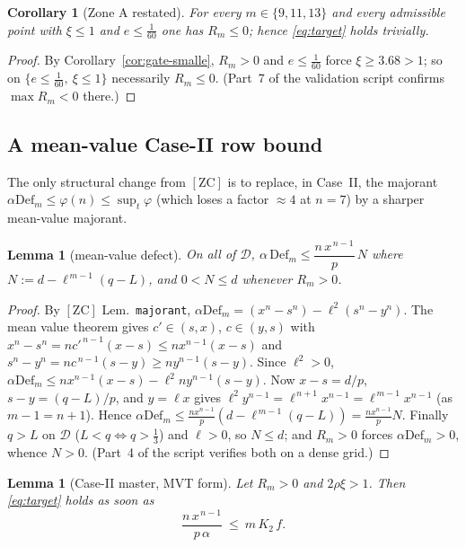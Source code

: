 \documentclass[11pt]{amsart}
\newtheorem{lemma}[theorem]{Lemma}
\newtheorem{corollary}[theorem]{Corollary}
\newcommand{\D}{\mathcal D}
\newcommand{\Def}{\mathrm{Def}}
\newcommand{\ZC}{[\textrm{ZC}]}
\begin{document}
\begin{corollary}[Zone A restated]\label{zc9:cor:za}
For every $m\in\{9,11,13\}$ and every admissible point with $\xi\le1$ and
$e\le\tfrac1{60}$ one has $R_m\le0$; hence \eqref{eq:target} holds trivially.
\end{corollary}

\begin{proof}
By Corollary~\ref{cor:gate-smalle}, $R_m>0$ and $e\le\tfrac1{60}$ force
$\xi\ge3.68>1$; so on $\{e\le\tfrac1{60},\ \xi\le1\}$ necessarily $R_m\le0$.
(Part~7 of the validation script confirms $\max R_m<0$ there.)
\end{proof}

\subsection*{A mean-value Case-II row bound}
The only structural change from $\ZC$ is to replace, in Case~II, the majorant
$\alpha\Def_m\le\varphi(n)\le\sup_t\varphi$ (which loses a factor $\approx4$ at
$n=7$) by a sharper mean-value majorant.

\begin{lemma}[mean-value defect]\label{zc9:lem:mvt}
On all of $\D$, $\alpha\,\Def_m\le\dfrac{n\,x^{\,n-1}}p\,N$ where
$N:=d-\ell^{\,m-1}(q-L)$, and $0<N\le d$ whenever $R_m>0$.
\end{lemma}

\begin{proof}
By $\ZC$ Lem.~\texttt{majorant}, $\alpha\Def_m=(x^n-s^n)-\ell^2(s^n-y^n)$.  The
mean value theorem gives $c'\in(s,x)$, $c\in(y,s)$ with
$x^n-s^n=nc'^{\,n-1}(x-s)\le nx^{n-1}(x-s)$ and
$s^n-y^n=nc^{\,n-1}(s-y)\ge ny^{n-1}(s-y)$.  Since $\ell^2>0$,
$\alpha\Def_m\le nx^{n-1}(x-s)-\ell^2 ny^{n-1}(s-y)$.  Now $x-s=d/p$,
$s-y=(q-L)/p$, and $y=\ell x$ gives
$\ell^2 y^{n-1}=\ell^{\,n+1}x^{n-1}=\ell^{\,m-1}x^{n-1}$ (as $m-1=n+1$).  Hence
$\alpha\Def_m\le\tfrac{n x^{n-1}}p(d-\ell^{\,m-1}(q-L))=\tfrac{n x^{n-1}}p N$.
Finally $q>L$ on $\D$ ($L<q\iff q>\tfrac13$) and $\ell>0$, so $N\le d$; and
$R_m>0$ forces $\alpha\Def_m>0$, whence $N>0$.  (Part~4 of the script verifies
both on a dense grid.)
\end{proof}

\begin{lemma}[Case-II master, MVT form]\label{zc9:lem:mvtII}
Let $R_m>0$ and $2\rho\xi>1$.  Then \eqref{eq:target} holds as soon as
\begin{equation}\label{zc9:eq:SCII-mvt}
 \frac{n\,x^{\,n-1}}{p\,\alpha}\ \le\ m\,K_2\,f .
\end{equation}
\end{lemma}
\end{document}
